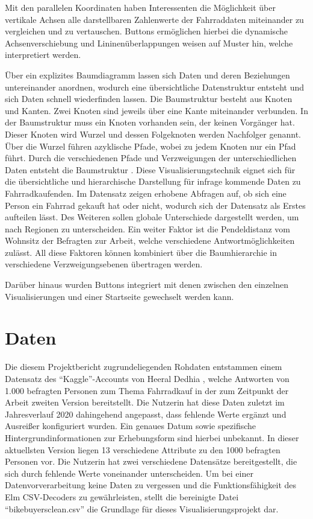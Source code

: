 \documentclass[usegeometry=true]{scrartcl}
\begin{document}
Mit den parallelen Koordinaten haben Interessenten die Möglichkeit über vertikale Achsen alle darstellbaren Zahlenwerte der Fahrraddaten miteinander zu vergleichen und zu vertauschen. Buttons ermöglichen hierbei die dynamische Achsenverschiebung und Lininenüberlappungen weisen auf Muster hin, welche interpretiert werden. 


Über ein explizites Baumdiagramm lassen sich Daten und deren Beziehungen untereinander anordnen, wodurch eine übersichtliche Datenstruktur entsteht und sich Daten schnell wiederfinden lassen. Die Baumstruktur besteht aus Knoten und Kanten. Zwei Knoten sind jeweils über eine Kante miteinander verbunden. In der Baumstruktur muss ein Knoten vorhanden sein, der keinen Vorgänger hat. Dieser Knoten wird Wurzel und dessen Folgeknoten werden Nachfolger genannt. Über die Wurzel führen azyklische Pfade, wobei zu jedem Knoten nur ein Pfad führt. Durch die verschiedenen Pfade und Verzweigungen der unterschiedlichen Daten entsteht die Baumstruktur \cite{Gumm.2016}. Diese Visualisierungstechnik eignet sich für die übersichtliche und hierarchische Darstellung für infrage kommende Daten zu Fahrradkaufenden. Im Datensatz zeigen erhobene Abfragen auf, ob sich eine Person ein Fahrrad gekauft hat oder nicht, wodurch sich der Datensatz als Erstes aufteilen lässt. Des Weiteren sollen globale Unterschiede dargestellt werden, um nach Regionen zu unterscheiden. Ein weiter Faktor ist die Pendeldistanz vom Wohnsitz der Befragten zur Arbeit, welche verschiedene Antwortmöglichkeiten zulässt. All diese Faktoren können kombiniert über die Baumhierarchie in verschiedene Verzweigungsebenen übertragen werden. 

Darüber hinaus wurden Buttons integriert mit denen zwischen den einzelnen Visualisierungen und einer Startseite gewechselt werden kann. 

\section{Daten}
Die diesem Projektbericht zugrundeliegenden Rohdaten entstammen einem Datensatz des "`Kaggle"'-Accounts von Heeral Dedhia \cite{Dedhia.22.09.2020}, welche Antworten von 1.000 befragten Personen zum Thema Fahrradkauf in der zum Zeitpunkt der Arbeit zweiten Version bereitstellt. Die Nutzerin hat diese Daten zuletzt im Jahresverlauf 2020 dahingehend angepasst, dass fehlende Werte ergänzt und Ausreißer konfiguriert wurden. Ein genaues Datum sowie spezifische Hintergrundinformationen zur Erhebungsform sind hierbei unbekannt. In dieser aktuellsten Version liegen 13 verschiedene Attribute zu den 1000 befragten Personen vor. Die Nutzerin hat zwei verschiedene Datensätze bereitgestellt, die sich durch fehlende Werte voneinander unterscheiden. Um bei einer Datenvorverarbeitung keine Daten zu vergessen und die Funktionsfähigkeit des Elm CSV-Decoders zu gewährleisten, stellt die bereinigte Datei "`bikebuyersclean.csv"' die Grundlage für dieses Visualisierungsprojekt dar.
\end{document}
